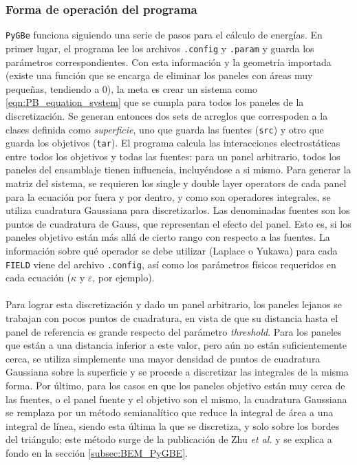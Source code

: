 \documentclass[12pt, oneside, numbers, spanish]{ezthesis}
\numberwithin{equation}{section}
\begin{document}
\subsubsection{Forma de operación del programa}
\texttt{PyGBe} funciona siguiendo una serie de pasos para el cálculo de energías. En primer lugar, el programa lee los archivos \texttt{.config} y \texttt{.param} y guarda los parámetros correspondientes. Con esta información y la geometría importada (existe una función que se encarga de eliminar los paneles con áreas muy pequeñas, tendiendo a 0), la meta es crear un sistema como \ref{eqn:PB_equation_system} que se cumpla para todos los paneles de la discretización. Se generan entonces dos sets de arreglos que correspoden a la clases definida como \textit{superficie}, uno que guarda las fuentes (\texttt{src}) y otro que guarda los objetivos (\texttt{tar}). El programa calcula las interacciones electrostáticas entre todos los objetivos y todas las fuentes: para un panel arbitrario, todos los paneles del ensamblaje tienen influencia, incluyéndose a si mismo. Para generar la matriz del sistema, se requieren los single y double layer operators de cada panel para la ecuación por fuera y por dentro, y como son operadores integrales, se utiliza cuadratura Gaussiana para discretizarlos. Las denominadas fuentes son los puntos de cuadratura de Gauss, que representan el efecto del panel. Esto es, si los paneles objetivo están más allá de cierto rango con respecto a las fuentes. La información sobre qué operador se debe utilizar (Laplace o Yukawa) para cada \texttt{FIELD} viene del archivo \texttt{.config}, así como los parámetros físicos requeridos en cada ecuación ($\kappa$ y $\varepsilon$, por ejemplo).\\\\
Para lograr esta discretización y dado un panel arbitrario, los paneles lejanos se trabajan con pocos puntos de cuadratura, en vista de que su distancia hasta el panel de referencia es grande respecto del parámetro \textit{threshold}. Para los paneles que están a una distancia inferior a este valor, pero aún no están suficientemente cerca, se utiliza simplemente una mayor densidad de puntos de cuadratura Gaussiana sobre la superficie y se procede a discretizar las integrales de la misma forma. Por último, para los casos en que los paneles objetivo están muy cerca de las fuentes, o el panel fuente y el objetivo son el mismo, la cuadratura Gaussiana se remplaza por un método semianalítico que reduce la integral de área a una integral de línea, siendo esta última la que se discretiza, y solo sobre los bordes del triángulo; este método surge de la publicación de Zhu \textit{et al.} \cite{Zhu} y se explica a fondo en la sección \ref{subsec:BEM_PyGBE}.\\\\
\end{document}
